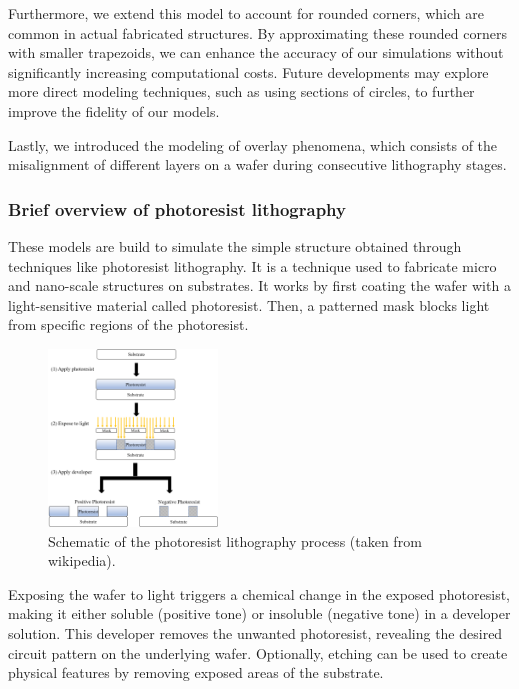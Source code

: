 \medskip

Furthermore, we extend this model to account for rounded corners, which are common in actual fabricated structures. By approximating 
these rounded corners with smaller trapezoids, we can enhance the accuracy of our simulations without significantly increasing 
computational costs. Future developments may explore more direct modeling techniques, such as using sections of circles, to further
improve the fidelity of our models.

\medskip

Lastly, we introduced the modeling of overlay phenomena, which consists of the misalignment of different layers on a wafer during 
consecutive lithography stages.


\subsubsection{Brief overview of photoresist lithography}

These models are build to simulate the simple structure obtained through techniques like photoresist 
lithography. It is a technique used to fabricate micro and nano-scale structures on substrates. 
It works by first coating the wafer with a light-sensitive material called photoresist. Then, a patterned
mask blocks light from specific regions of the photoresist. 
\begin{figure}[h]
    \centering
    \includegraphics[width=0.4\textwidth]{images/photo_resist.png}
    \caption{Schematic of the photoresist lithography process (taken from wikipedia).}
    \label{fig:lithography}
\end{figure}

\FloatBarrier

Exposing the wafer to light triggers a 
chemical change in the exposed photoresist, making it either soluble (positive tone) or insoluble 
(negative tone) in a developer solution. This developer removes the unwanted photoresist, 
revealing the desired circuit pattern on the underlying wafer. Optionally, etching can be used to 
create physical features by removing exposed areas of the substrate.

